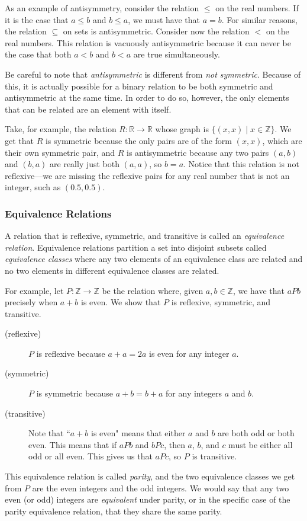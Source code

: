 \documentclass[11pt,oneside]{book}
\theoremstyle{definition}
\begin{document}
As an example of antisymmetry, consider the relation $\leq$ on the real numbers.
If it is the case that $a \leq b$ and $b \leq a$, we must have that $a = b$.
For similar reasons, the relation $\subseteq$ on sets is antisymmetric.
Consider now the relation $<$ on the real numbers.
This relation is vacuously antisymmetric because it can never be the case that both $a < b$ and $b < a$ are true simultaneously.

Be careful to note that \emph{antisymmetric} is different from \emph{not symmetric}.
Because of this, it is actually possible for a binary relation to be both symmetric and antisymmetric at the same time.
In order to do so, however, the only elements that can be related are an element with itself.

Take, for example, the relation $R: \mathbb{R} \to \mathbb{R}$ whose graph is $\{ (x, x) \mid x \in \mathbb{Z} \}$.
We get that $R$ is symmetric because the only pairs are of the form $(x, x)$, which are their own symmetric pair, and $R$ is antisymmetric because any two pairs $(a, b)$ and $(b, a)$ are really just both $(a, a)$, so $b = a$.
Notice that this relation is not reflexive---we are missing the reflexive pairs for any real number that is not an integer, such as $(0.5, 0.5)$.


\subsubsection{Equivalence Relations}
A relation that is reflexive, symmetric, and transitive is called an \emph{equivalence relation}.
Equivalence relations partition a set into disjoint subsets called \emph{equivalence classes} where any two elements of an equivalence class are related and no two elements in different equivalence classes are related.

For example, let $P: \mathbb{Z} \to \mathbb{Z}$ be the relation where, given $a, b \in \mathbb{Z}$, we have that $aPb$ precisely when $a + b$ is even.
We show that $P$ is reflexive, symmetric, and transitive.
\begin{description}
    \item[(reflexive)] $P$ is reflexive because $a + a = 2a$ is even for any integer $a$.

    \item[(symmetric)] $P$ is symmetric because $a + b = b + a$ for any integers $a$ and $b$.

    \item[(transitive)] Note that ``$a + b$ is even" means that either $a$ and $b$ are both odd or both even.
    This means that if $aPb$ and $bPc$, then $a$, $b$, and $c$ must be either all odd or all even.
    This gives us that $aPc$, so $P$ is transitive.
\end{description}
This equivalence relation is called \emph{parity}, and the two equivalence classes we get from $P$ are the even integers and the odd integers.
We would say that any two even (or odd) integers are \emph{equivalent} under parity, or in the specific case of the parity equivalence relation, that they share the same parity.
\end{document}
